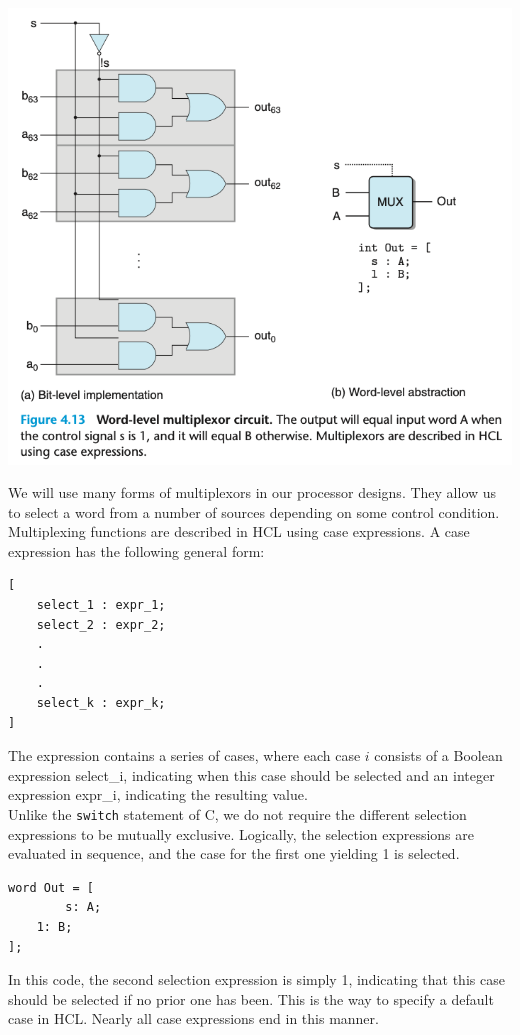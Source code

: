 \documentclass[11pt]{article}
\begin{document}
\begin{center}
\includegraphics[width=.9\linewidth]{pics/figure4.13-word-level-multiplexor-circuit.png}
\end{center}

We will use many forms of multiplexors in our processor designs. They allow us to select a word from a number of sources depending on some control condition. Multiplexing functions are described in HCL using case expressions. A case expression has the following general form:\\
\begin{verbatim}
[
    select_1 : expr_1;
    select_2 : expr_2;
    .
    .
    .
    select_k : expr_k;
]
\end{verbatim}
The expression contains a series of cases, where each case \(i\) consists of a Boolean expression select\_i, indicating when this case should be selected and an integer expression expr\_i, indicating the resulting value.\\

Unlike the \texttt{switch} statement of C, we do not require the different selection expressions to be mutually exclusive. Logically, the selection expressions are evaluated in sequence, and the case for the first one yielding 1 is selected.\\

\begin{verbatim}
word Out = [
        s: A;
	1: B;
];
\end{verbatim}
In this code, the second selection expression is simply 1, indicating that this case should be selected if no prior one has been. This is the way to specify a default case in HCL. Nearly all case expressions end in this manner.\\
\end{document}

